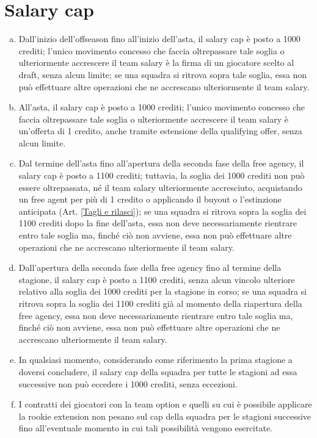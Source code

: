 \documentclass{article}
\begin{document}
\section{Salary cap}\label{Salary cap}
\begin{enumerate}[(a)]
\item Dall'inizio dell'offseason fino all'inizio dell'asta, il salary cap è posto a 1000 crediti; l'unico movimento concesso che faccia oltrepassare tale soglia o ulteriormente accrescere il team salary è la firma di un giocatore scelto al draft, senza alcun limite; se una squadra si ritrova sopra tale soglia, essa non può effettuare altre operazioni che ne accrescano ulteriormente il team salary.
\item All'asta, il salary cap è posto a 1000 crediti; l'unico movimento concesso che faccia oltrepassare tale soglia o ulteriormente accrescere il team salary è un'offerta di 1 credito, anche tramite estensione della qualifying offer, senza alcun limite.
\item Dal termine dell'asta fino all'apertura della seconda fase della free agency, il salary cap è posto a 1100 crediti; tuttavia, la soglia dei 1000 crediti non può essere oltrepassata, né il team salary ulteriormente accresciuto, acquistando un free agent per più di 1 credito o applicando il buyout o l'estinzione anticipata (Art. \ref{Tagli e rilasci}); se una squadra si ritrova sopra la soglia dei 1100 crediti dopo la fine dell'asta, essa non deve necessariamente rientrare entro tale soglia ma, finché ciò non avviene, essa non può effettuare altre operazioni che ne accrescano ulteriormente il team salary.
\item Dall'apertura della seconda fase della free agency fino al termine della stagione, il salary cap è posto a 1100 crediti, senza alcun vincolo ulteriore relativo alla soglia dei 1000 crediti per la stagione in corso; se una squadra si ritrova sopra la soglia dei 1100 crediti già al momento della riapertura della free agency, essa non deve necessariamente rientrare entro tale soglia ma, finché ciò non avviene, essa non può effettuare altre operazioni che ne accrescano ulteriormente il team salary.
\item In qualsiasi momento, considerando come riferimento la prima stagione a doversi concludere, il salary cap della squadra per tutte le stagioni ad essa successive non può eccedere i 1000 crediti, senza eccezioni.
\item I contratti dei giocatori con la team option e quelli su cui è possibile applicare la rookie extension non pesano sul cap della squadra per le stagioni successive fino all'eventuale momento in cui tali possibilità vengono esercitate.
\end{enumerate}
\end{document}
